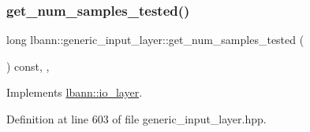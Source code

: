 \subsubsection{\texorpdfstring{get\+\_\+num\+\_\+samples\+\_\+tested()}{get\_num\_samples\_tested()}}
{\footnotesize\ttfamily long lbann\+::generic\+\_\+input\+\_\+layer\+::get\+\_\+num\+\_\+samples\+\_\+tested (\begin{DoxyParamCaption}{ }\end{DoxyParamCaption}) const\hspace{0.3cm}{\ttfamily [inline]}, {\ttfamily [override]}, {\ttfamily [virtual]}}



Implements \hyperlink{classlbann_1_1io__layer_a2b2c9d3c1efce23840ef0c88ec566616}{lbann\+::io\+\_\+layer}.



Definition at line 603 of file generic\+\_\+input\+\_\+layer.\+hpp.


